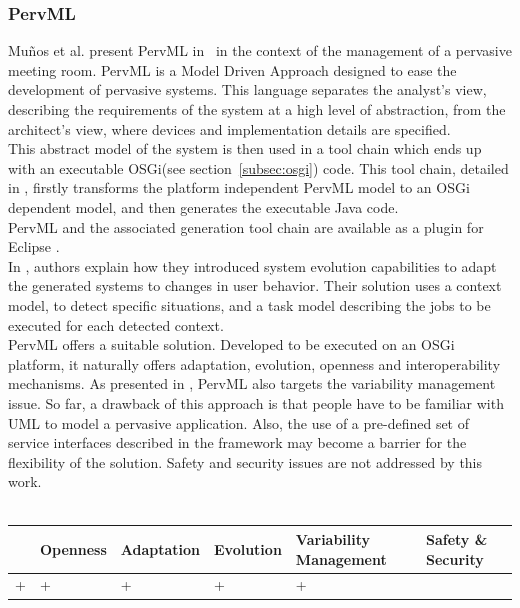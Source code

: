 \subsubsection{PervML}
Mu\~nos et al. present PervML in~\cite{Munoz:2006a,Munoz:2006b} in the context of the management of a pervasive meeting room. PervML is a Model Driven Approach designed to ease the development of pervasive systems. This language separates the analyst's view, describing the requirements of the system at a high level of abstraction, from the architect's view, where devices and implementation details are specified.\\
This abstract model of the system is then used in a tool chain which ends up with an executable OSGi(see section~\ref{subsec:osgi}) code. This tool chain, detailed in \cite{Munoz:2006}, firstly transforms the platform independent PervML model to an OSGi dependent model, and then generates the executable Java code.\\
PervML and the associated generation tool chain are available as a plugin for Eclipse \cite{Cetina:2007}.\\
In \cite{Serral:2010a}, authors explain how they introduced system evolution capabilities to adapt the generated systems to changes in user behavior. Their solution uses a context model, to detect specific situations, and a task model describing the jobs to be executed for each detected context.\\

PervML offers a suitable solution. Developed to be executed on an OSGi platform, it naturally offers adaptation, evolution, openness and interoperability mechanisms. As presented in \cite{Cetina:2009}, PervML also targets the variability management issue. So far, a drawback of this approach is that people have to be familiar with UML to model a pervasive application. Also, the use of a pre-defined set of service interfaces described in the framework may become a barrier for the flexibility of the solution. Safety and security issues are not addressed by this work.\\
\\
\begin{tabular}{ >{\centering}m{}| >{\centering}m{} >{\centering}m{}| >{\centering}m{} >{\centering}m{}| >{\centering\arraybackslash}m{}}
{\tiny Interoperability} & {\tiny Openness} & {\tiny Adaptation} & {\tiny Evolution} & {\tiny Variability Management} & {\tiny Safety \& Security}\\
 \hline
 + & + & + & + & + & \\ 
  \hline
\end{tabular}\\




